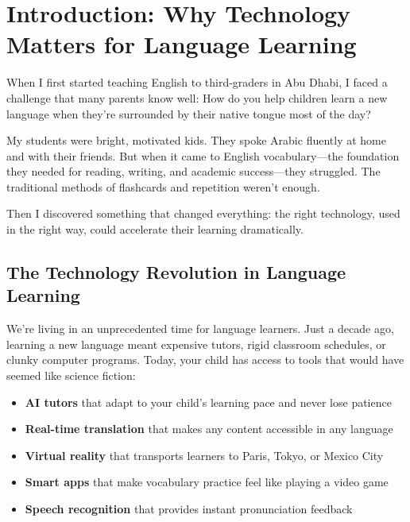 \documentclass[11pt,oneside]{book}
\newcommand{\mainmatter}{
  \cleardoublepage
  \pagenumbering{arabic}
  \setcounter{page}{1}
}
\begin{document}
\tableofcontents


\mainmatter


\chapter*{Introduction: Why Technology Matters for Language Learning}

When I first started teaching English to third-graders in Abu Dhabi, I faced a challenge that many parents know well: How do you help children learn a new language when they're surrounded by their native tongue most of the day?

My students were bright, motivated kids. They spoke Arabic fluently at home and with their friends. But when it came to English vocabulary—the foundation they needed for reading, writing, and academic success—they struggled. The traditional methods of flashcards and repetition weren't enough.

Then I discovered something that changed everything: the right technology, used in the right way, could accelerate their learning dramatically.

\section*{The Technology Revolution in Language Learning}

We're living in an unprecedented time for language learners. Just a decade ago, learning a new language meant expensive tutors, rigid classroom schedules, or clunky computer programs. Today, your child has access to tools that would have seemed like science fiction:

\begin{itemize}
\item \textbf{AI tutors} that adapt to your child's learning pace and never lose patience
\item \textbf{Real-time translation} that makes any content accessible in any language
\item \textbf{Virtual reality} that transports learners to Paris, Tokyo, or Mexico City
\item \textbf{Smart apps} that make vocabulary practice feel like playing a video game
\item \textbf{Speech recognition} that provides instant pronunciation feedback
\end{itemize}
\end{document}
